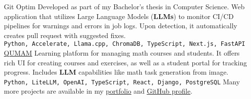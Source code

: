\documentclass[8pt]{developercv} %
\begin{document}
\begin{entrylist}
    \entry
		{\phantom}
		{Git Optim}
		{}
		{Developed as part of my Bachelor's thesis in Computer Science. Web application that utilizes Large Language Models (\textbf{LLMs}) to monitor CI/CD pipelines for warnings and errors in job logs. Upon detection, it automatically creates pull request with suggested fixes.\\[2mm]
        \texttt{Python, Accelerate, Llama.cpp, ChromaDB, TypeScript, Next.js, FastAPI}}
    \entry
		{\phantom}
		{\underline{\href{https://qumam.edu.pl}{QUMAM}}}
		{}
		{Learning platform for managing math courses and students. It offers rich UI for creating courses and exercises, as well as a student portal for tracking progress. Includes \textbf{LLM} capabilities like math task generation from image.\\[2mm]
        \texttt{Python, LiteLLM, OpenAI, TypeScript, React, Django, PostgreSQL}}
    \entry
		{}
		{\vspace{-3mm}}
		{}
		{Many more projects are available in my \underline{\href{https://lukasz.leszko.dev/}{portfolio}} and \underline{\href{https://github.com/leszkolukasz}{GitHub profile}}.}
\end{entrylist}
\end{document}

